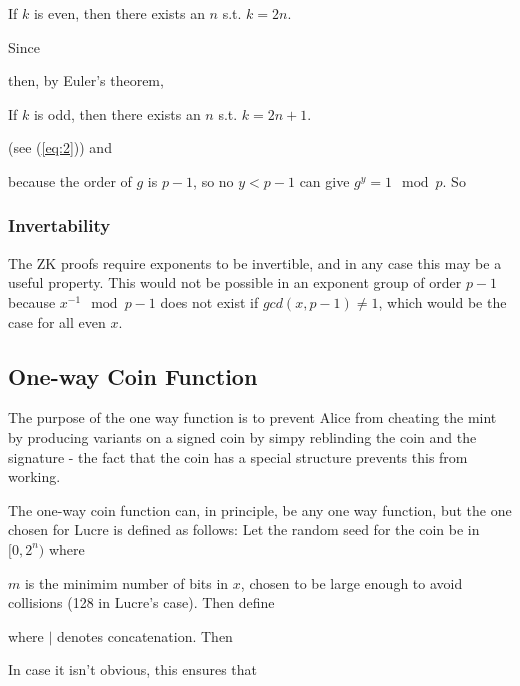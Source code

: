 \documentclass[a4paper,titlepage]{article}
\begin{document}
If $k$ is even, then there exists an $n$
s.t. $k=2n$.


Since


then, by Euler's theorem, 


If $k$ is odd, then there exists an $n$ s.t. $k=2n+1$.



(see (\ref{eq:2})) and


because the order of $g$ is $p-1$, so no $y < p-1$ can give $g^y=1
 \mod p$. So


\subsubsection{Invertability}

The ZK proofs require exponents to be invertible, and in any case this
may be a useful property. This would not be possible in an exponent
group of order $p-1$ because $x^{-1}
\mod{p-1}$ does not exist if $gcd(x,p-1) \neq 1$, which would be the
case for all even $x$.

\subsection{One-way Coin Function}
\label{sec:oneway}

The purpose of the one way function is to prevent Alice from cheating
the mint by producing variants on a signed coin by simpy reblinding
the coin and the signature - the fact that the coin has a special
structure prevents this from working.

The one-way coin function can, in principle, be any one way function,
but the one chosen for Lucre is defined as follows: Let the random
seed for the coin be in $[0,2^n)$ where 


$m$ is the minimim number of bits in $x$, chosen to be large
enough to avoid collisions (128 in Lucre's case). Then define


where $|$ denotes concatenation. Then


In case it isn't obvious, this ensures that

\end{document}
